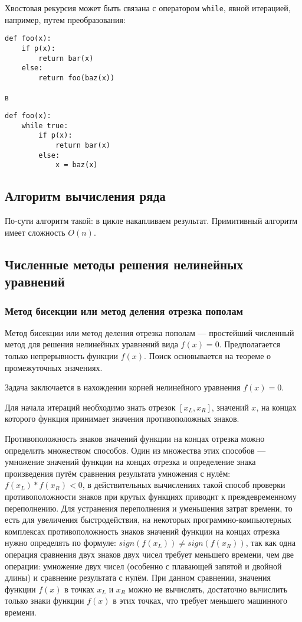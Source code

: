 Хвостовая рекурсия может быть связана с оператором \texttt{while}, явной итерацией, например, путем преобразования:

\begin{verbatim}
def foo(x):
	if p(x):
		return bar(x)
	else:
		return foo(baz(x))
\end{verbatim}

в

\begin{verbatim}
def foo(x):
	while true:
		if p(x):
			return bar(x)
		else:
			x = baz(x)
\end{verbatim}

\subsection{Алгоритм вычисления ряда}

По-сути алгоритм такой: в цикле накапливаем результат. Примитивный алгоритм имеет сложность $O(n)$.

\subsection{Численные методы решения нелинейных уравнений}

\subsubsection{Метод бисекции или метод деления отрезка пополам}

Метод бисекции или метод деления отрезка пополам — простейший численный метод для решения нелинейных уравнений вида $f(x)=0$. Предполагается только непрерывность функции $f(x)$. Поиск основывается на теореме о промежуточных значениях.

Задача заключается в нахождении корней нелинейного уравнения $f(x)=0$.

Для начала итераций необходимо знать отрезок $[x_L, x_R]$, значений $x$, на концах которого функция принимает значения противоположных знаков.

Противоположность знаков значений функции на концах отрезка можно определить множеством способов. Один из множества этих способов — умножение значений функции на концах отрезка и определение знака произведения путём сравнения результата умножения с нулём: $f(x_L)*f(x_R)<0$, в действительных вычислениях такой способ проверки противоположности знаков при крутых функциях приводит к преждевременному переполнению.
Для устранения переполнения и уменьшения затрат времени, то есть для увеличения быстродействия, на некоторых программно-компьютерных комплексах противоположность знаков значений функции на концах отрезка нужно определять по формуле:
$sign(f(x_L)) \neq sign(f(x_R))$, так как одна операция сравнения двух знаков двух чисел требует меньшего времени, чем две операции: умножение двух чисел (особенно с плавающей запятой и двойной длины) и сравнение результата с нулём. При данном сравнении, значения функции $f(x)$ в точках $x_L$ и $x_R$ можно не вычислять, достаточно вычислить только знаки функции $f(x)$ в этих точках, что требует меньшего машинного времени.

